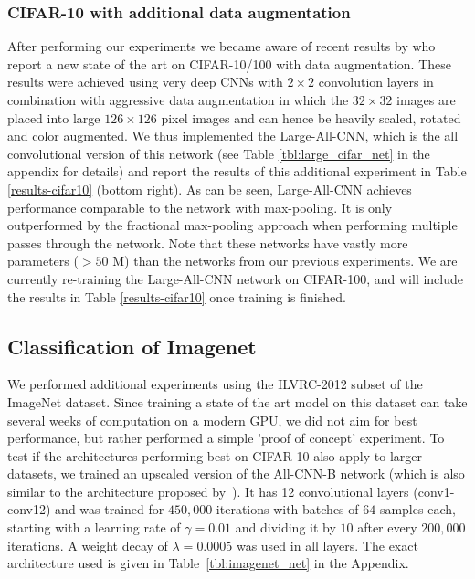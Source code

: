 \documentclass{article} \usepackage{iclr2015,times}
\begin{document}
\subsubsection{CIFAR-10 with additional data augmentation}
After performing our experiments we became aware of recent results by \citet{Graham2015} who report
a new state of the art on CIFAR-10/100 with data augmentation. These results 
were achieved using very deep CNNs with $2 \times 2$ convolution layers in combination with aggressive data augmentation 
in which the $32 \times 32$ images are placed into large $126 \times 126$ pixel images and can hence be 
heavily scaled, rotated and color augmented. We thus implemented the Large-All-CNN, which is the all convolutional version of this network (see Table \ref{tbl:large_cifar_net} in the appendix for details) and 
report the results of this additional experiment in Table \ref{results-cifar10} (bottom right).
As can be seen, Large-All-CNN achieves performance comparable to the network with max-pooling. 
It is only outperformed by the fractional max-pooling approach when performing multiple passes through the network. Note
that these networks have vastly more parameters ($> 50$ M) than the
networks from our previous experiments.
We are currently re-training the Large-All-CNN network on CIFAR-100,
and will include the results in Table \ref{results-cifar10} once training is finished. 

\subsection{Classification of Imagenet}
We performed additional experiments using the ILVRC-2012 subset of the ImageNet dataset. Since training a state of the art model on this dataset can take several weeks of computation on a modern GPU, we did not aim for best performance, but rather performed a simple 'proof of concept' experiment. To test if the architectures performing best on CIFAR-10 also apply to larger datasets, we trained an upscaled version of the All-CNN-B network (which is also similar to the architecture proposed by~\citet{Lin_2014}). It has 12 convolutional layers (conv1-conv12) and was trained for $450,000$ iterations with batches of $64$ samples each, starting with a learning rate of $\gamma = 0.01$ and dividing it by $10$ after every $200,000$ iterations. A weight decay of $\lambda = 0.0005$ was used in all layers. The exact architecture used is given in Table~\ref{tbl:imagenet_net} in the Appendix.
\end{document}

